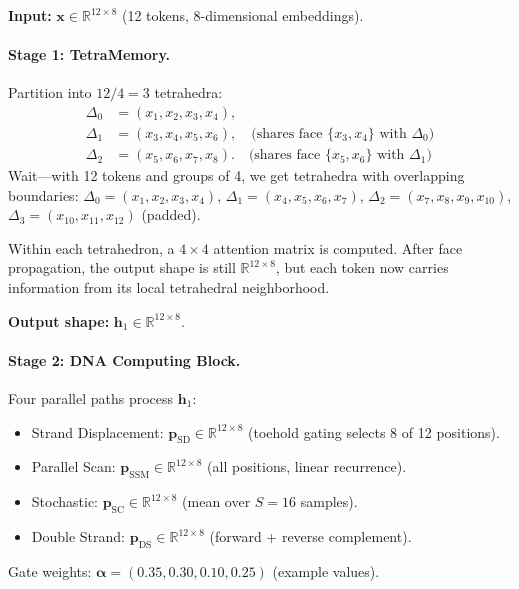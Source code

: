 \begin{example}
\label{ex:full-trace}
\textbf{Input:} $\mathbf{x} \in \mathbb{R}^{12 \times 8}$ (12 tokens, 8-dimensional embeddings).

\paragraph{Stage 1: TetraMemory.}
Partition into $12 / 4 = 3$ tetrahedra:
\begin{align*}
\Delta_0 &= (x_1, x_2, x_3, x_4), \\
\Delta_1 &= (x_3, x_4, x_5, x_6), \quad \text{(shares face } \{x_3, x_4\} \text{ with } \Delta_0\text{)} \\
\Delta_2 &= (x_5, x_6, x_7, x_8). \quad \text{(shares face } \{x_5, x_6\} \text{ with } \Delta_1\text{)}
\end{align*}
Wait---with 12 tokens and groups of 4, we get tetrahedra with overlapping boundaries:
$\Delta_0 = (x_1, x_2, x_3, x_4)$, $\Delta_1 = (x_4, x_5, x_6, x_7)$, $\Delta_2 = (x_7, x_8, x_9, x_{10})$, $\Delta_3 = (x_{10}, x_{11}, x_{12})$ (padded).

Within each tetrahedron, a $4 \times 4$ attention matrix is computed. After face propagation, the output shape is still $\mathbb{R}^{12 \times 8}$, but each token now carries information from its local tetrahedral neighborhood.

\textbf{Output shape:} $\mathbf{h}_1 \in \mathbb{R}^{12 \times 8}$.

\paragraph{Stage 2: DNA Computing Block.}
Four parallel paths process $\mathbf{h}_1$:
\begin{itemize}[leftmargin=1.5em]
  \item Strand Displacement: $\mathbf{p}_{\text{SD}} \in \mathbb{R}^{12 \times 8}$ (toehold gating selects 8 of 12 positions).
  \item Parallel Scan: $\mathbf{p}_{\text{SSM}} \in \mathbb{R}^{12 \times 8}$ (all positions, linear recurrence).
  \item Stochastic: $\mathbf{p}_{\text{SC}} \in \mathbb{R}^{12 \times 8}$ (mean over $S=16$ samples).
  \item Double Strand: $\mathbf{p}_{\text{DS}} \in \mathbb{R}^{12 \times 8}$ (forward + reverse complement).
\end{itemize}
Gate weights: $\boldsymbol{\alpha} = (0.35, 0.30, 0.10, 0.25)$ (example values).


\end{example}
